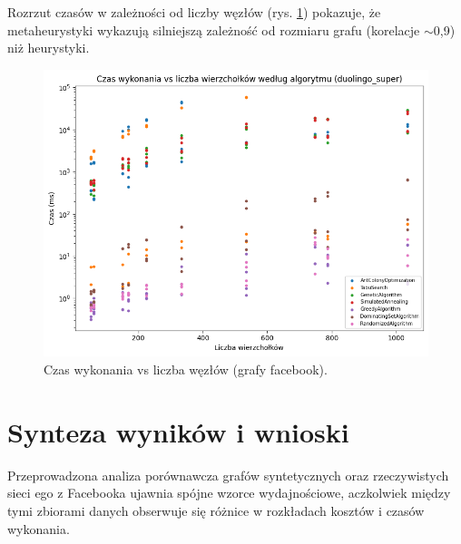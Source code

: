 Rozrzut czasów w zależności od liczby węzłów (rys. \ref{fig:facebook_time_scatter}) pokazuje, że metaheurystyki wykazują silniejszą zależność od rozmiaru grafu (korelacje $\sim$0,9) niż heurystyki.

\begin{figure}[H]
  \centering
  \includegraphics[width=0.7\linewidth]{assets/figures/facebook_time_scatter.png}
  \caption{Czas wykonania vs liczba węzłów (grafy facebook).}
  \label{fig:facebook_time_scatter}
\end{figure}

\section{Synteza wyników i wnioski}

Przeprowadzona analiza porównawcza grafów syntetycznych oraz rzeczywistych sieci ego z Facebooka ujawnia spójne wzorce wydajnościowe, aczkolwiek między tymi zbiorami danych obserwuje się różnice w rozkładach kosztów i czasów wykonania.

